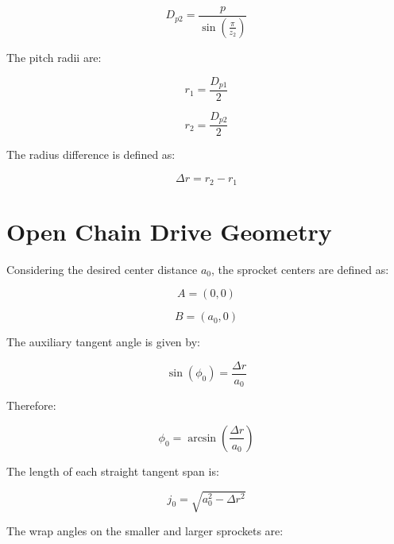 \documentclass[11pt,a4paper]{article}
\begin{document}
\begin{equation}
    D_{p2} = \frac{p}{\sin\left(\frac{\pi}{z_2}\right)}
\end{equation}

The pitch radii are:

\begin{equation}
    r_1 = \frac{D_{p1}}{2}
\end{equation}

\begin{equation}
    r_2 = \frac{D_{p2}}{2}
\end{equation}

The radius difference is defined as:

\begin{equation}
    \Delta r = r_2 - r_1
\end{equation}

\section{Open Chain Drive Geometry}

Considering the desired center distance $a_0$, the sprocket centers are defined as:

\begin{equation}
    A = (0,0)
\end{equation}

\begin{equation}
    B = (a_0,0)
\end{equation}

The auxiliary tangent angle is given by:

\begin{equation}
    \sin(\phi_0) = \frac{\Delta r}{a_0}
\end{equation}

Therefore:

\begin{equation}
    \phi_0 = \arcsin\left(\frac{\Delta r}{a_0}\right)
\end{equation}

The length of each straight tangent span is:

\begin{equation}
    j_0 = \sqrt{a_0^2 - \Delta r^2}
\end{equation}

The wrap angles on the smaller and larger sprockets are:
\end{document}
